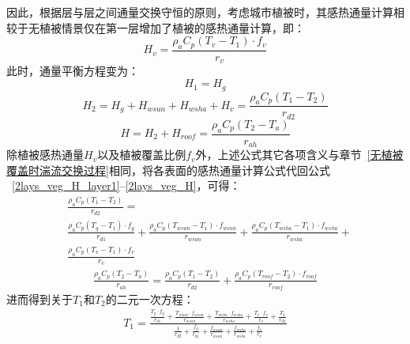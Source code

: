 因此，根据层与层之间通量交换守恒的原则，考虑城市植被时，其感热通量计算相较于无植被情景仅在第一层增加了植被的感热通量计算，即：
\begin{equation}
    H_{v} = \frac{\rho _a C_p \left( T_{v} - T_{1} \right) \cdot f_v}{r_{v}}
\end{equation}
此时，通量平衡方程变为：
\begin{equation}\label{2lays_veg_H_layer1}
    H_{1} = H_{g}
\end{equation}
%
\begin{equation}\label{2lays_veg_H_layer2}
    H_{2} = H_{g} + H_{wsun} + H_{wsha} + H_{v} = \frac{\rho _a C_p \left( T_{1} - T_{2} \right)}{r_{d2}}
\end{equation}
%
\begin{equation}\label{2lays_veg_H}
    H = H_{2} + H_{roof} = \frac{\rho _a C_p \left( T_{2} - T_a \right)}{r_{ah}}
\end{equation}
除植被感热通量$H_v$以及植被覆盖比例$f_v$外，上述公式其它各项含义与章节~\ref{无植被覆盖时湍流交换过程}相同，将各表面的感热通量计算公式代回公式 ~\ref{2lays_veg_H_layer1}--\ref{2lays_veg_H}，可得：
\begin{equation}
    \begin{split}
        & \frac{\rho _a C_p \left( T_{1} - T_{2} \right)}{r_{d2}} = \\
        & \frac{\rho _a C_p \left( T_{g} - T_{1} \right) \cdot f_{g}}{r_{d1}} + \frac{\rho _a C_p \left( T_{wsun} - T_{1} \right) \cdot f_{wsun}}{r_{wsun}} + \frac{\rho _a C_p \left( T_{wsha} - T_{1} \right) \cdot f_{wsha}}{r_{wsha}} + 
        \\ 
        & \frac{\rho _a C_p \left( T_{v} - T_{1} \right) \cdot f_v}{r_{v}}
    \end{split}
\end{equation}
%
\begin{equation}
    \begin{split}
        \frac{\rho _a C_p \left( T_{2} - T_a \right)}{r_{ah}} = 
        \frac{\rho _a C_p \left( T_{1} - T_{2} \right)}{r_{d2}} + \frac{\rho _a C_p \left( T_{roof} - T_{2} \right)\cdot f_{roof}}{r_{roof}}
    \end{split}
\end{equation}
进而得到关于$T_{1}$和$T_{2}$的二元一次方程：
\begin{equation}
    \begin{split}
         T_{1} =
         \frac{\frac{T_{g} \cdot f_{g}}{r_{d1}} + \frac{T_{wsun} \cdot f_{wsun}}{r_{wsun}} + \frac{T_{wsha} \cdot f_{wsha}}{r_{wsha}} + \frac{T_{v} \cdot f_v}{r_{v}} + \frac{T_{2}}{r_{d2}}}{\frac{1}{r_{d2}} + \frac{f_{g}}{r_{d1}} + \frac{f_{wsun}}{r_{wsun}} + \frac{f_{wsha}}{r_{wsha}} + \frac{f_v}{r_{v}}}
    \end{split}
\end{equation}
